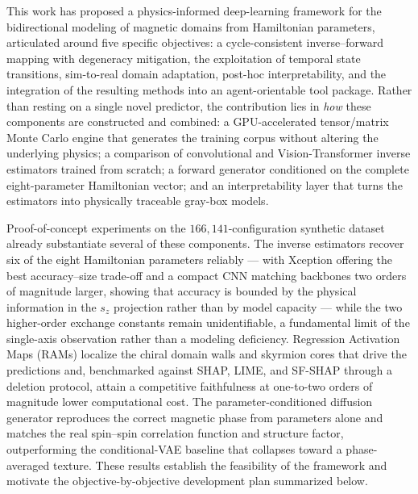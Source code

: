 \documentclass[letterpaper, 12, one column]{article}
\begin{document}
This work has proposed a physics-informed deep-learning framework for the bidirectional modeling of magnetic domains from Hamiltonian parameters, articulated around five specific objectives: a cycle-consistent inverse--forward mapping with degeneracy mitigation, the exploitation of temporal state transitions, sim-to-real domain adaptation, post-hoc interpretability, and the integration of the resulting methods into an agent-orientable tool package. Rather than resting on a single novel predictor, the contribution lies in \emph{how} these components are constructed and combined: a GPU-accelerated tensor/matrix Monte Carlo engine that generates the training corpus without altering the underlying physics; a comparison of convolutional and Vision-Transformer inverse estimators trained from scratch; a forward generator conditioned on the complete eight-parameter Hamiltonian vector; and an interpretability layer that turns the estimators into physically traceable gray-box models.

Proof-of-concept experiments on the $166{,}141$-configuration synthetic dataset already substantiate several of these components. The inverse estimators recover six of the eight Hamiltonian parameters reliably --- with Xception offering the best accuracy--size trade-off and a compact CNN matching backbones two orders of magnitude larger, showing that accuracy is bounded by the physical information in the $s_z$ projection rather than by model capacity --- while the two higher-order exchange constants remain unidentifiable, a fundamental limit of the single-axis observation rather than a modeling deficiency. Regression Activation Maps (RAMs) localize the chiral domain walls and skyrmion cores that drive the predictions and, benchmarked against SHAP, LIME, and SF-SHAP through a deletion protocol, attain a competitive faithfulness at one-to-two orders of magnitude lower computational cost. The parameter-conditioned diffusion generator reproduces the correct magnetic phase from parameters alone and matches the real spin--spin correlation function and structure factor, outperforming the conditional-VAE baseline that collapses toward a phase-averaged texture. These results establish the feasibility of the framework and motivate the objective-by-objective development plan summarized below.
\end{document}
